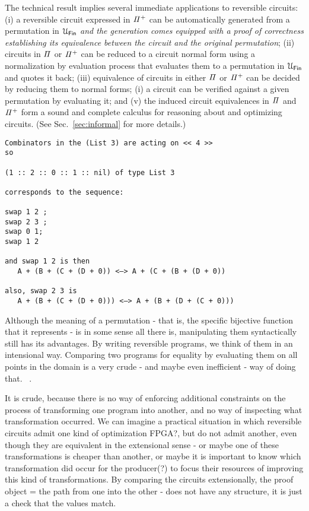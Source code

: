 The technical result implies several immediate applications to reversible
circuits: (i) a reversible circuit expressed in $\mathit{{\Pi}^{+}}$ can be
automatically generated from a permutation in $\UFin$ \emph{and the generation
  comes equipped with a proof of correctness establishing its equivalence
  between the circuit and the original permutation}; (ii) circuits in $\mathit{\Pi}$
or $\mathit{{\Pi}^{+}}$ can be reduced to a circuit normal form using a normalization
by evaluation process that evaluates them to a permutation in $\UFin$ and quotes
it back; (iii) equivalence of circuits in either $\mathit{\Pi}$ or $\mathit{{\Pi}^{+}}$ can
be decided by reducing them to normal forms; (i) a circuit can be verified
against a given permutation by evaluating it; and (v) the induced circuit
equivalences in $\mathit{\Pi}$ and $\mathit{{\Pi}^{+}}$ form a sound and complete calculus
for reasoning about and optimizing circuits. (See Sec.~\ref{sec:informal} for
more details.)

\begin{verbatim}
Combinators in the (List 3) are acting on << 4 >>
so

(1 :: 2 :: 0 :: 1 :: nil) of type List 3

corresponds to the sequence:

swap 1 2 ;
swap 2 3 ;
swap 0 1;
swap 1 2

and swap 1 2 is then
   A + (B + (C + (D + 0)) <—> A + (C + (B + (D + 0))

also, swap 2 3 is
   A + (B + (C + (D + 0))) <—> A + (B + (D + (C + 0)))
\end{verbatim}

Although the meaning of a permutation - that is, the specific bijective function
that it represents - is in some sense all there is, manipulating them
syntactically still has its advantages. By writing reversible programs, we think
of them in an intensional way. Comparing two programs for equality by evaluating
them on all points in the domain is a very crude - and maybe even inefficient -
way of doing that. ~\cite{Kuehlmann:2006:RBR:2298470.2300327,10.1007/978-3-540-24605-3_4,Yamashita:2010:FEQ:1835957.1835965}.

It is crude, because there is no way of enforcing additional constraints on the
process of transforming one program into another, and no way of inspecting what
transformation occurred. We can imagine a practical situation in which reversible
circuits admit one kind of optimization FPGA?, but do not admit another,
even though they are equivalent in the extensional sense - or maybe one of these
transformations is cheaper than another, or maybe it is important to know which
transformation did occur for the producer(?) to focus their resources of
improving this kind of transformations. By comparing the circuits extensionally,
the proof object = the path from one into the other - does not have any
structure,  it is just a check that the values match.

